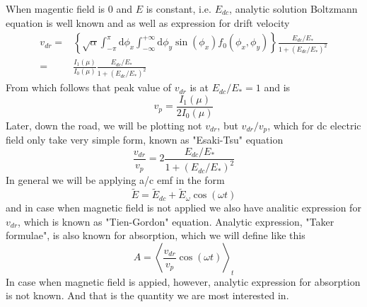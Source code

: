 \documentclass[40pt,letterpaper,physrev]{article}
\begin{document}
    When magentic field is $0$ and $E$ is constant, i.e. $E_{dc}$, analytic 
    solution Boltzmann equation is well known and as well as expression for 
    drift velocity
    \begin{align}
	v_{dr}=&\left \{ \sqrt{\alpha}\int^{\pi}_{-\pi}\text{d}\phi_x\int^{+\infty}_{-\infty}\text{d}\phi_y\sin(\phi_x)f_0(\phi_x,\phi_y)\right \}
	\frac{E_{dc}/E_*}{1+(E_{dc}/E_*)^2} \\
	=&\frac{I_1(\mu)}{I_0(\mu)}\frac{E_{dc}/E_*}{1+(E_{dc}/E_*)^2}
    \end{align}
	From which follows that peak value of $v_{dr}$ is at $E_{dc}/E_*=1$ and is 
	\begin{equation}
		v_p=\frac{I_1(\mu)}{2I_0(\mu)}\label{eq:v_peak}
	\end{equation}
	Later, down the road, we will be plotting not $v_{dr}$, but $v_{dr}/v_p$,
	which for dc electric field only take very simple form, known as "Esaki-Tsu" equation
	\begin{equation}
		\frac{v_{dr}}{v_p}=2\frac{E_{dc}/E_*}{1+(E_{dc}/E_*)^2}
	\end{equation}
	In general we will be applying a/c emf in the form 
	\begin{equation}
	\tilde{E}=\tilde{E}_{dc}+\tilde{E}_{\omega}\cos(\omega t)\label{eq:tilde_E_as_a_function_of_time}
	\end{equation}
	and in case when magnetic field is not applied we also have analitic expression for $v_{dr}$, which is known as "Tien-Gordon" equation. Analytic expression, "Taker formulae", is also known for absorption, which we will define like this
	\begin{equation}
	A=\left <\frac{v_{dr}}{v_p}\cos(\omega t) \right >_{t}
	\end{equation}
	In case when magnetic field is appied, however, analytic expression for absorption is not known. And that is the quantity we are most interested in.
	
\end{document}
